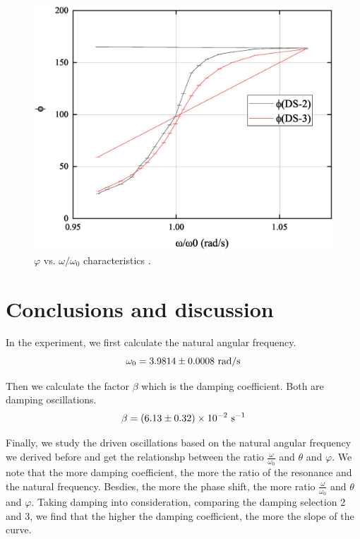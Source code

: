 \documentclass[a4paper]{report}
\begin{document}
	\begin{figure}[H]
		\centering
		\includegraphics[width=1\linewidth]{5.eps}
		\caption{$\varphi$ vs. $\omega/\omega_0$ characteristics .}
	\end{figure}
	\section{Conclusions and discussion}
	In the experiment, we first calculate the natural angular frequency.
	\begin{equation*}
	\omega_0=3.9814\pm0.0008\ \rm{rad/s}
	\end{equation*}
	
	Then we calculate the factor $\beta$ which is the damping coefficient. Both are damping oscillations.
	\begin{equation*}
		\beta=(6.13\pm0.32)\times10^{-2}\ \rm s^{-1}
	\end{equation*}
	
	Finally, we study the driven oscillations based on the natural angular frequency we derived before and get the relationshp between the ratio $\frac{\omega}{\omega_0}$ and $\theta$ and $\varphi$. We note that the more damping coefficient, the more the ratio of the resonance and the natural frequency. Besdies, the more the phase shift, the more ratio $\frac{\omega}{\omega_0}$ and $\theta$ and $\varphi$. Taking damping into consideration, comparing the damping selection 2 and 3, we find that the higher the damping coefficient, the more the slope of the curve.
\end{document}

